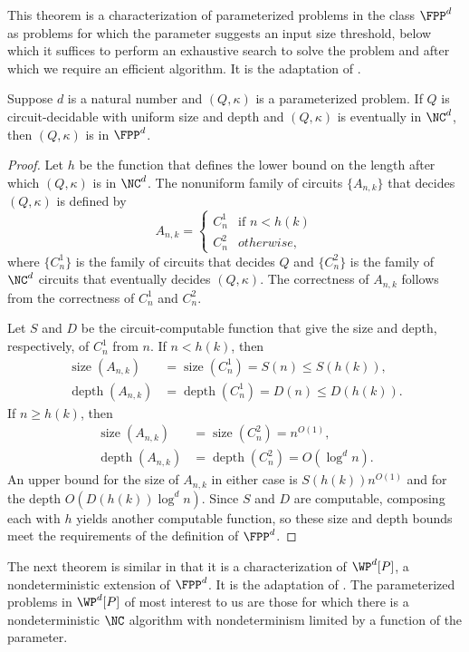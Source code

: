 \documentclass{article}
\DeclareMathOperator{\depth}{depth}
\DeclareMathOperator{\size}{size}
\begin{document}
This theorem is a characterization of parameterized problems in the class $\FPP^d$ as problems for which the parameter suggests an input size threshold, below which it suffices to perform an exhaustive search to solve the problem and after which we require an efficient algorithm.
It is the adaptation of \autocite[Theorem~1.37]{fg06}.

\begin{theorem}\label{thm:eventually}
  Suppose $d$ is a natural number and $(Q, \kappa)$ is a parameterized problem.
  If $Q$ is circuit-decidable with uniform size and depth and $(Q, \kappa)$ is eventually in $\NC^d$, then $(Q, \kappa)$ is in $\FPP^d$.
\end{theorem}
\begin{proof}
  Let $h$ be the function that defines the lower bound on the length after which $(Q, \kappa)$ is in $\NC^d$.
  The nonuniform family of circuits $\{A_{n, k}\}$ that decides $(Q, \kappa)$ is defined by
  \[
  A_{n, k} =
  \begin{cases}
    C^1_n & \text{if } n < h(k) \\
    C^2_n & otherwise,
  \end{cases}
  \]
  where $\{C^1_n\}$ is the family of circuits that decides $Q$ and $\{C^2_n\}$ is the family of $\NC^d$ circuits that eventually decides $(Q, \kappa)$.
  The correctness of $A_{n, k}$ follows from the correctness of $C^1_n$ and $C^2_n$.

  Let $S$ and $D$ be the circuit-computable function that give the size and depth, respectively, of $C^1_n$ from $n$.
  If $n < h(k)$, then
  \begin{align*}
    \size(A_{n, k}) & = \size(C^1_n) = S(n) \leq S(h(k)), \\
    \depth(A_{n, k}) & = \depth(C^1_n) = D(n) \leq D(h(k)).
  \end{align*}
  If $n \geq h(k)$, then
  \begin{align*}
    \size(A_{n, k}) & = \size(C^2_n) = n^{O(1)}, \\
    \depth(A_{n, k}) & = \depth(C^2_n) = O(\log^d n).
  \end{align*}
  An upper bound for the size of $A_{n, k}$ in either case is $S(h(k)) n^{O(1)}$ and for the depth $O(D(h(k)) \log^d n)$.
  Since $S$ and $D$ are computable, composing each with $h$ yields another computable function, so these size and depth bounds meet the requirements of the definition of $\FPP^d$.
\end{proof}

The next theorem is similar in that it is a characterization of $\WP^d[P]$, a nondeterministic extension of $\FPP^d$.
It is the adaptation of \autocite[Proposition~3.7]{fg06}.
The parameterized problems in $\WP^d[P]$ of most interest to us are those for which there is a nondeterministic $\NC$ algorithm with nondeterminism limited by a function of the parameter.
\end{document}
